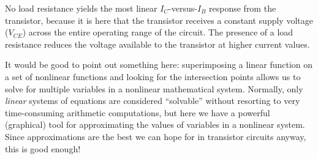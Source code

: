 No load resistance yields the most linear $I_C$-versus-$I_B$ response from the transistor, because it is here that the transistor receives a constant supply voltage ($V_{CE}$) across the entire operating range of the circuit.  The presence of a load resistance reduces the voltage available to the transistor at higher current values.







It would be good to point out something here: superimposing a linear function on a set of nonlinear functions and looking for the intersection points allows us to solve for multiple variables in a nonlinear mathematical system.  Normally, only {\it linear} systems of equations are considered ``solvable'' without resorting to very time-consuming arithmetic computations, but here we have a powerful (graphical) tool for approximating the values of variables in a nonlinear system.  Since approximations are the best we can hope for in transistor circuits anyway, this is good enough!




